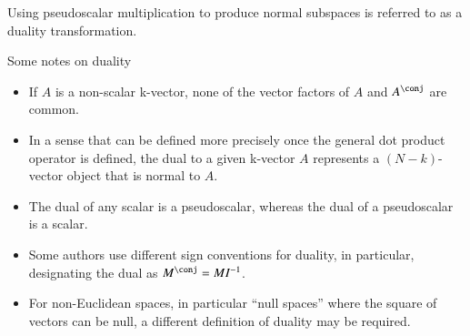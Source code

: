 
Using pseudoscalar multiplication to produce normal subspaces
is referred to as a duality transformation.


Some notes on duality

\begin{itemize}
\item If \( A \) is a non-scalar k-vector, none of the vector factors of \( A \) and \( A^\conj \) are common.
\item In a sense that can be defined more precisely once the general dot product operator is defined, the dual to a given k-vector \( A \) represents a \((N-k)\)-vector object that is normal to \( A \).
\item The dual of any scalar is a pseudoscalar, whereas the dual of a pseudoscalar is a scalar.
\item Some authors use different sign conventions for duality, in particular, designating the dual as \( M^\conj = M I^{-1} \).
\item For non-Euclidean spaces, in particular ``null spaces'' where the square of vectors can be null, a different definition of duality may be required.
\end{itemize}




